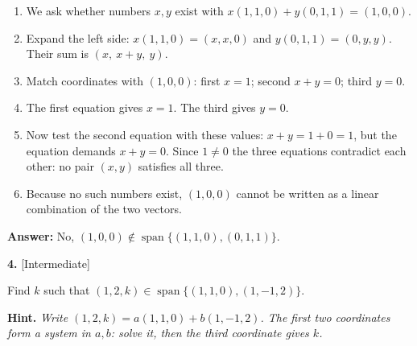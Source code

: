 \documentclass[11pt]{article}
\begin{document}
\begin{tcolorbox}[breakable,colback=ans,colframe=ansb,boxrule=0.5pt,left=4pt,right=4pt,top=2pt,bottom=2pt]\begin{enumerate}[leftmargin=2.2em,itemsep=1pt,topsep=1pt,label=\textbf{Step \arabic*.}]\item We ask whether numbers $x,y$ exist with $x(1,1,0)+y(0,1,1)=(1,0,0)$.
\item Expand the left side: $x(1,1,0)=(x,x,0)$ and $y(0,1,1)=(0,y,y)$. Their sum is $(x,\ x+y,\ y)$.
\item Match coordinates with $(1,0,0)$: first $x=1$; second $x+y=0$; third $y=0$.
\item The first equation gives $x=1$. The third gives $y=0$.
\item Now test the second equation with these values: $x+y=1+0=1$, but the equation demands $x+y=0$. Since $1\ne0$ the three equations contradict each other: no pair $(x,y)$ satisfies all three.
\item Because no such numbers exist, $(1,0,0)$ cannot be written as a linear combination of the two vectors.
\end{enumerate}\textbf{Answer:} No, $(1,0,0)\notin\operatorname{span}\{(1,1,0),(0,1,1)\}$.\end{tcolorbox}
\par\vspace{2pt}
\begin{minipage}{\linewidth}\textbf{4.} \hfill{\scriptsize\color{ink}[Intermediate]}\par\nopagebreak Find $k$ such that $(1,2,k)\in\operatorname{span}\{(1,1,0),(1,-1,2)\}$.
\par\smallskip\begingroup\small\color{ink}\textbf{Hint.} \textit{Write $(1,2,k)=a(1,1,0)+b(1,-1,2)$. The first two coordinates form a system in $a,b$: solve it, then the third coordinate gives $k$.}\endgroup
\end{minipage}\par\nopagebreak
\end{document}

